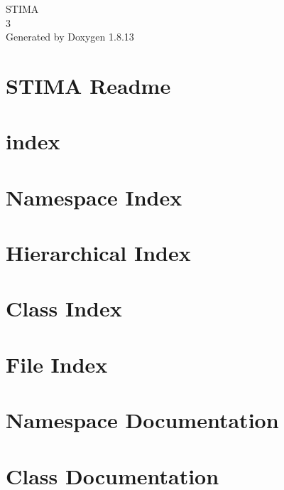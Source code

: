 \documentclass[twoside]{book}
\newcommand{\+}{\discretionary{\mbox{\scriptsize$\hookleftarrow$}}{}{}}
\newcommand{\clearemptydoublepage}{%
  \newpage{\pagestyle{empty}\cleardoublepage}%
}
\begin{document}
\hypersetup{pageanchor=false,
             bookmarksnumbered=true,
             pdfencoding=unicode
            }
\begin{titlepage}
\vspace*{7cm}
\begin{center}%
{\Large S\+T\+I\+MA \\[1ex]\large 3 }\\
\vspace*{1cm}
{\large Generated by Doxygen 1.8.13}\\
\end{center}
\end{titlepage}
\clearemptydoublepage
{}
\tableofcontents
\clearemptydoublepage
{}
\hypersetup{pageanchor=true}

\chapter{S\+T\+I\+MA Readme}
\label{index}\hypertarget{index}{}
\chapter{index}
\label{md_index}

\chapter{Namespace Index}

\chapter{Hierarchical Index}

\chapter{Class Index}

\chapter{File Index}

\chapter{Namespace Documentation}



\chapter{Class Documentation}















\end{document}
